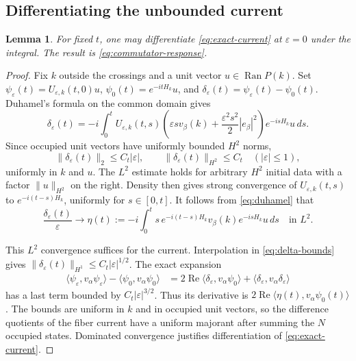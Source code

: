 \documentclass[11pt,a4paper]{article}
\newcommand{\ip}[2]{\langle #1,#2\rangle}
\newcommand{\norm}[1]{\lVert #1\rVert}
\DeclareMathOperator{\Ran}{Ran}
\DeclareMathOperator{\Ree}{Re}
\newtheorem{lemma}[lemma]{Lemma}
\numberwithin{equation}{section}
\begin{document}
\subsection{Differentiating the unbounded current}

\begin{lemma}\label{lem:differentiation}
For fixed $t$, one may differentiate \eqref{eq:exact-current} at
$\varepsilon=0$ under the integral. The result is
\eqref{eq:commutator-response}.
\end{lemma}

\begin{proof}
Fix $k$ outside the crossings and a unit vector $u\in\Ran P(k)$. Set
$\psi_\varepsilon(t)=U_{\varepsilon,k}(t,0)u$,
$\psi_0(t)=e^{-itH_k}u$, and
$\delta_\varepsilon(t)=\psi_\varepsilon(t)-\psi_0(t)$.
Duhamel's formula on the common domain gives
\begin{equation}\label{eq:duhamel}
 \delta_\varepsilon(t)
 =-i\int_0^t U_{\varepsilon,k}(t,s)
 \left(\varepsilon s v_\beta(k)
       +\frac{\varepsilon^2s^2}{2}|e_\beta|^2\right)
 e^{-isH_k}u\,ds.
\end{equation}
Since occupied unit vectors have uniformly bounded $H^2$ norms,
\begin{equation}\label{eq:delta-bounds}
 \norm{\delta_\varepsilon(t)}_2\leq C_t|\varepsilon|,
 \qquad
 \norm{\delta_\varepsilon(t)}_{H^2}\leq C_t
 \quad(|\varepsilon|\leq1),
\end{equation}
uniformly in $k$ and $u$. The $L^2$ estimate holds for arbitrary $H^2$
initial data with a factor $\norm{u}_{H^2}$ on the right. Density then
gives strong convergence of $U_{\varepsilon,k}(t,s)$ to
$e^{-i(t-s)H_k}$, uniformly for $s\in[0,t]$.
It follows from \eqref{eq:duhamel} that
\begin{equation}\label{eq:vector-derivative}
 \frac{\delta_\varepsilon(t)}{\varepsilon}
 \longrightarrow
 \eta(t):=-i\int_0^t s\,e^{-i(t-s)H_k}
 v_\beta(k)e^{-isH_k}u\,ds
 \quad\text{in }L^2.
\end{equation}

This $L^2$ convergence suffices for the current. Interpolation in
\eqref{eq:delta-bounds} gives
$\norm{\delta_\varepsilon(t)}_{H^1}\leq C_t|\varepsilon|^{1/2}$.
The exact expansion
\begin{equation}\label{eq:current-expansion}
 \begin{split}
 \ip{\psi_\varepsilon}{v_\alpha\psi_\varepsilon}
 -\ip{\psi_0}{v_\alpha\psi_0}
 &=2\Ree\ip{\delta_\varepsilon}{v_\alpha\psi_0}
   +\ip{\delta_\varepsilon}{v_\alpha\delta_\varepsilon}
 \end{split}
\end{equation}
has a last term bounded by $C_t|\varepsilon|^{3/2}$. Thus its derivative
is $2\Ree\ip{\eta(t)}{v_\alpha\psi_0(t)}$. The bounds are uniform in
$k$ and in occupied unit vectors, so the difference quotients of the
fiber current have a uniform majorant after summing the $N$ occupied
states. Dominated convergence justifies differentiation of
\eqref{eq:exact-current}.


\end{proof}
\end{document}
